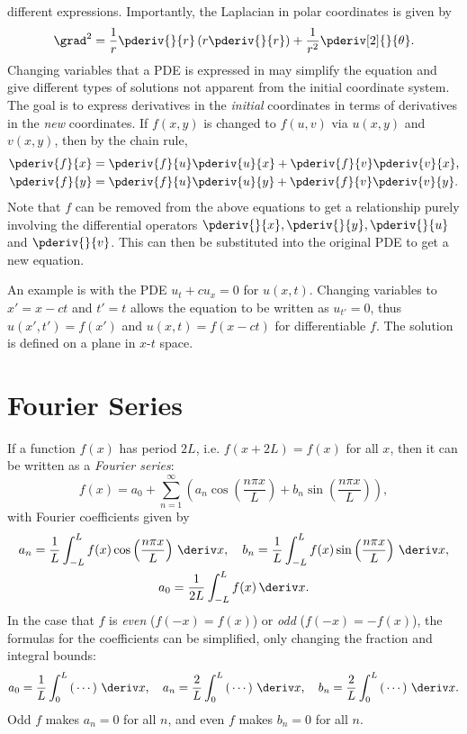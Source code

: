 \documentclass[10pt, a4paper]{article}
\begin{document}
\begin{landscape}
\begin{multicols*}{2}
    different expressions. Importantly, the Laplacian in polar coordinates is given by
    \[
        \grad^2 = \frac{1}{r} \pderiv{}{r} \left(r \pderiv{}{r}\right) + \frac{1}{r^2} \pderiv[2]{}{\theta}.
    \]
    Changing variables that a PDE is expressed in may simplify the equation and give different
    types of solutions not apparent from the initial coordinate system.
    The goal is to express derivatives in the \emph{initial} coordinates in terms of
    derivatives in the \emph{new} coordinates. If \(f(x, y)\) is changed to \(f(u, v)\) via
    \(u(x, y)\) and \(v(x, y)\), then by the chain rule,
    \begin{align*}
        \pderiv{f}{x} &= \pderiv{f}{u} \pderiv{u}{x} + \pderiv{f}{v} \pderiv{v}{x}, \\
        \pderiv{f}{y} &= \pderiv{f}{u} \pderiv{u}{y} + \pderiv{f}{v} \pderiv{v}{y}.
    \end{align*}
    Note that \(f\) can be removed from the above equations to get a relationship purely involving
    the differential operators \(\pderiv{}{x}, \pderiv{}{y}, \pderiv{}{u}\) and \(\pderiv{}{v}\).
    This can then be substituted into the original PDE to get a new equation.

    An example is with the PDE \(u_t + c u_x = 0\) for \(u(x, t)\). Changing variables to
    \(x' = x - ct\) and \(t' = t\) allows the equation to be written as \(u_{t'} = 0\), thus
    \(u(x', t') = f(x')\) and \(u(x, t) = f(x-ct)\) for differentiable \(f\). The solution is
    defined on a plane in \(x\)-\(t\) space.
    
    \section{Fourier Series}

    If a function \(f(x)\) has period \(2L\), i.e. \(f(x + 2L) = f(x)\) for all \(x\), then
    it can be written as a \emph{Fourier series}:
    \[
        f(x)
        = a_0 + \sum_{n=1}^{\infty} \left(
            a_n \cos\left(\frac{n \pi x}{L}\right)
            + b_n \sin\left(\frac{n \pi x}{L}\right)
        \right),
    \]
    with Fourier coefficients given by
    \begin{gather*}
        a_n = \frac{1}{L} \int_{-L}^{L} f(x) \cos\left(\frac{n \pi x}{L}\right) \,\deriv x,
        \quad
        b_n = \frac{1}{L} \int_{-L}^{L} f(x) \sin\left(\frac{n \pi x}{L}\right) \,\deriv x, \\
        a_0 = \frac{1}{2L} \int_{-L}^{L} f(x) \,\deriv x.
    \end{gather*}
    In the case that \(f\) is \emph{even} (\(f(-x) = f(x)\)) or \emph{odd} (\(f(-x) = -f(x)\)), the formulas for
    the coefficients can be simplified, only changing the fraction and integral bounds:
    \[
        a_0 = \frac{1}{L} \int_0^L \left(\,\cdots\right) \,\deriv x,
        \quad
        a_n = \frac{2}{L} \int_0^L \left(\,\cdots\right) \,\deriv x,
        \quad
        b_n = \frac{2}{L} \int_0^L \left(\,\cdots\right) \,\deriv x.
    \]
    Odd \(f\) makes \(a_n = 0\) for all \(n\), and even \(f\) makes \(b_n = 0\) for all \(n\).


\end{multicols*}
\end{landscape}
\end{document}
